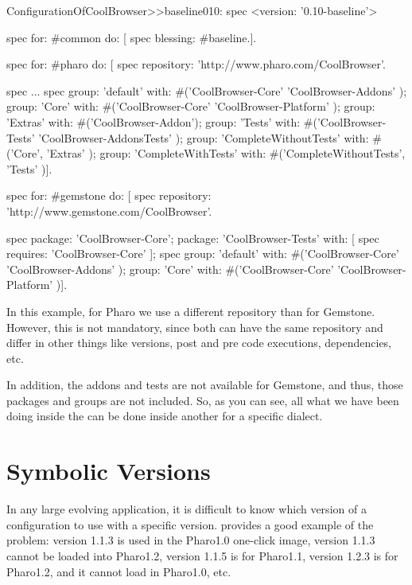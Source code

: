 \documentclass[a4paper,10pt,twoside]{book}
\begin{document}
  \begin{code}{}
 ConfigurationOfCoolBrowser>>baseline010: spec 
       <version: '0.10-baseline'>
       
       spec for: #common do: [
              spec blessing: #baseline.].
       
       spec for: #pharo do: [
              spec repository: 'http://www.pharo.com/CoolBrowser'.
              
              spec 
                     ...
              spec 
                     group: 'default' with: #('CoolBrowser-Core' 'CoolBrowser-Addons' );
                     group: 'Core' with: #('CoolBrowser-Core' 'CoolBrowser-Platform' );
                     group: 'Extras' with: #('CoolBrowser-Addon');
                     group: 'Tests' with: #('CoolBrowser-Tests' 'CoolBrowser-AddonsTests' );
                     group: 'CompleteWithoutTests' with: #('Core', 'Extras' );
                     group: 'CompleteWithTests' with: #('CompleteWithoutTests', 'Tests' )].
                     
       spec for: #gemstone do: [
              spec repository: 'http://www.gemstone.com/CoolBrowser'.
              
              spec 
                     package: 'CoolBrowser-Core';
                     package: 'CoolBrowser-Tests' with: [ spec requires: 'CoolBrowser-Core' ];
              spec 
                     group: 'default' with: #('CoolBrowser-Core' 'CoolBrowser-Addons' );
                     group: 'Core' with: #('CoolBrowser-Core' 'CoolBrowser-Platform' )].                     

\end{code}       
       
In this example, for Pharo we use a different repository than for Gemstone. However, this is not mandatory, since both can have the same repository and differ in other things like versions, post and pre code executions, dependencies, etc. 

In addition, the addons and tests are not available for Gemstone, and thus, those packages and groups are not included. So, as you can see, all what we have been doing inside the  can be done inside another  for a specific dialect. 


\section{Symbolic Versions}
In any large evolving application, it is difficult to know which version of a configuration to use with a specific version. 
 provides a good example of the problem: version 1.1.3 is used in the Pharo1.0 one-click image,  version 1.1.3 cannot be loaded into Pharo1.2, version 1.1.5 is for Pharo1.1, version 1.2.3 is for Pharo1.2, and it cannot load in Pharo1.0, etc. 
\end{document}
